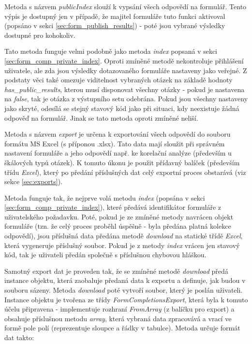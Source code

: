			Metoda s názvem \textit{publicIndex} slouží k vypsání všech odpovědí na formulář. Tento výpis je dostupný jen v případě, že majitel formuláře tuto funkci aktivoval (popsáno v sekci \ref{sec:form_publish_results}) - poté jsou vybrané výsledky dostupné pro kohokoliv. 
			
			Tato metoda funguje velmi podobně jako metoda \textit{index} popsaná v sekci \ref{sec:form_comp_private_index}. Oproti zmíněné metodě nekontroluje přihlášení uživatele, ale zda jsou výsledky dotazovaného formuláře nastaveny jako veřejné. Z podstaty věci také omezuje viditelnost vybraných otázek na základě hodnoty \textit{has\_public\_results}, kterou musí disponovat všechny otázky - pokud je nastavena na \textit{false}, tak je otázka z výstupního setu odebrána. Pokud jsou všechny nastaveny jako skryté, odesílá se stejný stavový kód jako při situaci, kdy neexistuje žádná odpověď na formulář. Jinak se tato metoda oproti zmíněné neliší.
			
			Metoda s názvem \textit{export} je určena k exportování všech odpovědí do souboru formátu MS Excel (s příponou .xlsx). Tato data mají sloužit při správném nastavení formuláře a jeho odpovědí např. ke korelační analýze (především u škálových typů otázek). K tomuto úkonu je použit přídavný balíček  (především třídu \textit{Excel}), který po předání příslušných dat celý exportní proces obstarává (viz sekce \ref{sec:exports}).
			
			Metoda funguje tak, že nejprve volá metodu \textit{index} (popsána v sekci \ref{sec:form_comp_private_index}), které předává identifikátor formuláře z uživatelského požadavku. Poté, pokud je ze zmíněné metody navrácen objekt formuláře (tzn. že celý proces proběhl úspěšně - byla předána platná kolekce odpovědí), jsou příslušná data předána metodě \textit{download} na statické třídě \textit{Excel}, která vygeneruje příslušný soubor. Pokud je z metody \textit{index} vrácen jen stavový kód, tak je uživateli předán společně s příslušnou chybovou hláškou.
			
			Samotný export dat je proveden tak, že se zmíněné metodě \textit{download} předá instance objektu, která zaobaluje předaná data k exportu a definuje, jak budou v souboru sázeny. Metoda \textit{download} poté vytvoří soubor, který je poslán uživateli. Instance objektu je tvořena ze třídy \textit{FormCompletionsExport}, která byla k tomuto účelu připravena - implementuje rozhraní \textit{FromArray} (z balíčku pro export) a obsahuje příslušnou metodu \textit{array}, která vybraná data zpracovává a vrací ve formě pole polí (reprezentuje sloupce a řádky v tabulce). Metoda určuje formát dat takto:
			
